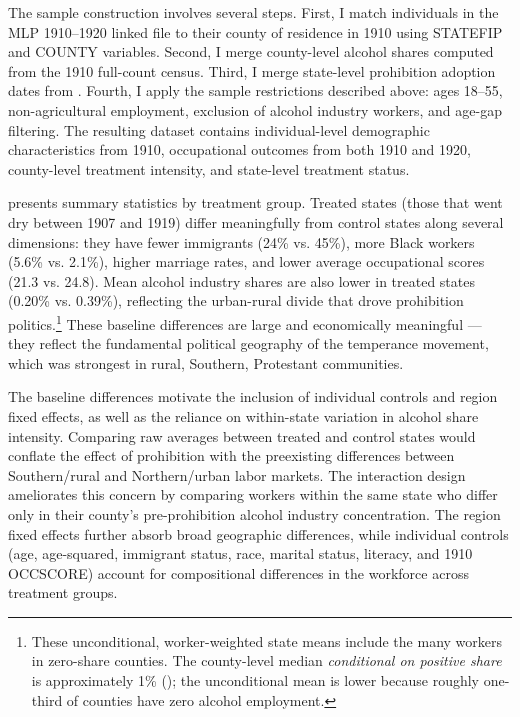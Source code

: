 \documentclass[12pt]{article}
\begin{document}
The sample construction involves several steps. First, I match individuals in the MLP 1910--1920 linked file to their county of residence in 1910 using STATEFIP and COUNTY variables. Second, I merge county-level alcohol shares computed from the 1910 full-count census. Third, I merge state-level prohibition adoption dates from \citet{beienburg2020}. Fourth, I apply the sample restrictions described above: ages 18--55, non-agricultural employment, exclusion of alcohol industry workers, and age-gap filtering. The resulting dataset contains individual-level demographic characteristics from 1910, occupational outcomes from both 1910 and 1920, county-level treatment intensity, and state-level treatment status.

 presents summary statistics by treatment group. Treated states (those that went dry between 1907 and 1919) differ meaningfully from control states along several dimensions: they have fewer immigrants (24\% vs. 45\%), more Black workers (5.6\% vs. 2.1\%), higher marriage rates, and lower average occupational scores (21.3 vs. 24.8). Mean alcohol industry shares are also lower in treated states (0.20\% vs. 0.39\%), reflecting the urban-rural divide that drove prohibition politics.\footnote{These unconditional, worker-weighted state means include the many workers in zero-share counties. The county-level median \emph{conditional on positive share} is approximately 1\% (); the unconditional mean is lower because roughly one-third of counties have zero alcohol employment.} These baseline differences are large and economically meaningful --- they reflect the fundamental political geography of the temperance movement, which was strongest in rural, Southern, Protestant communities.

The baseline differences motivate the inclusion of individual controls and region fixed effects, as well as the reliance on within-state variation in alcohol share intensity. Comparing raw averages between treated and control states would conflate the effect of prohibition with the preexisting differences between Southern/rural and Northern/urban labor markets. The interaction design ameliorates this concern by comparing workers within the same state who differ only in their county's pre-prohibition alcohol industry concentration. The region fixed effects further absorb broad geographic differences, while individual controls (age, age-squared, immigrant status, race, marital status, literacy, and 1910 OCCSCORE) account for compositional differences in the workforce across treatment groups.
\end{document}
